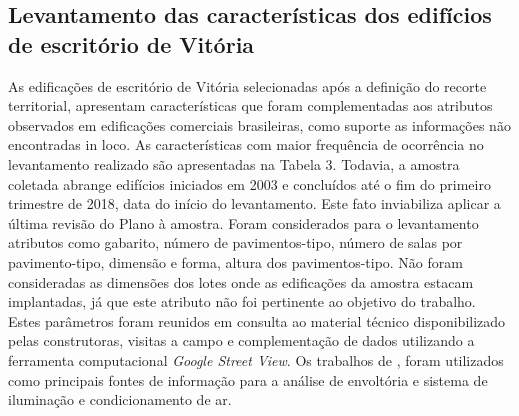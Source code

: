 \subsection{Levantamento das características dos edifícios de escritório de Vitória}
As edificações de escritório de Vitória selecionadas após a definição do recorte 
territorial, apresentam características que foram complementadas aos atributos 
observados em edificações comerciais brasileiras, como suporte as informações não 
encontradas in loco. As características com maior frequência de ocorrência no 
levantamento realizado são apresentadas na Tabela 3. Todavia, a amostra coletada 
abrange edifícios iniciados em 2003 e concluídos até o fim do primeiro trimestre 
de 2018, data do início do levantamento. Este fato inviabiliza aplicar a última 
revisão do Plano à amostra.\vspace*{0.3cm} \newline
Foram considerados para o levantamento atributos como gabarito, número de 
pavimentos-tipo, número de salas por pavimento-tipo, dimensão e forma, altura 
dos pavimentos-tipo. Não foram consideradas as dimensões dos lotes onde as 
edificações da amostra estacam implantadas, já que este atributo não foi 
pertinente ao objetivo do trabalho. Estes parâmetros foram reunidos em consulta 
ao material técnico disponibilizado pelas construtoras, visitas a campo e 
complementação de dados utilizando a ferramenta computacional \textit{Google Street View}.\vspace*{0.3cm} \newline
Os trabalhos de \textcite{Lamberts2006,AmericanSocietyofHeatingRefrigeratingandAir-ConditioningEngineers-ASHRAE2010,Bernabe2012,Ramos2013,Didone2014,Didone2014a,ConselhoBrasileirodeConstrucaoSustentavel-CBCS2015,Fonseca2016,Werneck2017,InstitutoNacionaldeMetrologiaNormalizacaoeQualidadeIndustrial-INMETRO2018},
foram utilizados como principais fontes de informação para a análise de envoltória 
e sistema de iluminação e condicionamento de ar.\vspace*{-0.3cm}
